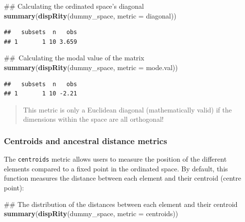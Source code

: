\documentclass[]{book}
\newenvironment{Shaded}{\begin{snugshade}}{\end{snugshade}}
\newcommand{\KeywordTok}[1]{\textcolor[rgb]{0.13,0.29,0.53}{\textbf{#1}}}
\newcommand{\DataTypeTok}[1]{\textcolor[rgb]{0.13,0.29,0.53}{#1}}
\newcommand{\NormalTok}[1]{#1}
\theoremstyle{definition}
\theoremstyle{definition}
\theoremstyle{remark}
\begin{document}
\begin{Shaded}
\begin{Highlighting}[]
\NormalTok{## Calculating the ordinated space's diagonal}
\KeywordTok{summary}\NormalTok{(}\KeywordTok{dispRity}\NormalTok{(dummy_space, }\DataTypeTok{metric =}\NormalTok{ diagonal))}
\end{Highlighting}
\end{Shaded}

\begin{verbatim}
##   subsets  n   obs
## 1       1 10 3.659
\end{verbatim}

\begin{Shaded}
\begin{Highlighting}[]
\NormalTok{## Calculating the modal value of the matrix}
\KeywordTok{summary}\NormalTok{(}\KeywordTok{dispRity}\NormalTok{(dummy_space, }\DataTypeTok{metric =}\NormalTok{ mode.val))}
\end{Highlighting}
\end{Shaded}

\begin{verbatim}
##   subsets  n   obs
## 1       1 10 -2.21
\end{verbatim}

\begin{quote}
This metric is only a Euclidean diagonal (mathematically valid) if the
dimensions within the space are all orthogonal!
\end{quote}

\subsubsection{Centroids and ancestral distance
metrics}\label{centroids-and-ancestral-distance-metrics}

The \texttt{centroids} metric allows users to measure the position of
the different elements compared to a fixed point in the ordinated space.
By default, this function measures the distance between each element and
their centroid (centre point):

\begin{Shaded}
\begin{Highlighting}[]
\NormalTok{## The distribution of the distances between each element and their centroid}
\KeywordTok{summary}\NormalTok{(}\KeywordTok{dispRity}\NormalTok{(dummy_space, }\DataTypeTok{metric =}\NormalTok{ centroids))}
\end{Highlighting}
\end{Shaded}
\end{document}
